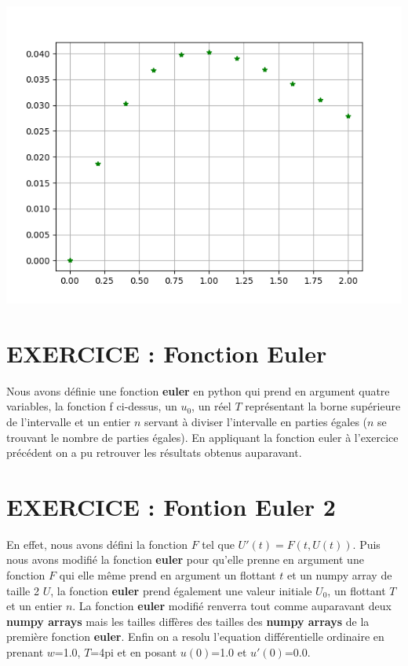 \documentclass{article}
\begin{document}
\begin{center}
	\includegraphics[scale=0.5]{erreur_exo2.png}
\end{center}

\section{EXERCICE : Fonction Euler}

Nous avons définie une fonction {\bf euler} en python qui prend en argument quatre variables, la fonction f ci-dessus, un $u_{0}$, un réel $T$ représentant la borne supérieure de l'intervalle et un entier $n$ servant à diviser l'intervalle en parties égales ($n$ se trouvant le nombre de parties égales). En appliquant la fonction euler à l'exercice précédent on a pu retrouver les résultats obtenus auparavant.

\section{EXERCICE : Fontion Euler 2}

En effet, nous avons défini la fonction $F$ tel que $U'(t)=F(t,U(t))$. Puis nous avons modifié la fonction {\bf euler} pour qu'elle prenne en argument une fonction $F$ qui elle même prend en argument un flottant $t$ et un numpy array de taille 2 $U$, la fonction {\bf euler} prend également une valeur initiale $U_{0}$, un flottant $T$ et un entier $n$. La fonction {\bf euler} modifié renverra tout comme auparavant deux \textbf{ numpy arrays} mais les tailles diffères des tailles des \textbf{ numpy arrays} de la première fonction {\bf euler}. Enfin on a resolu l'equation différentielle ordinaire en prenant $w$=1.0, $T$=4pi et en posant $u(0)$=1.0 et $u'(0)$=0.0.
\end{document}
